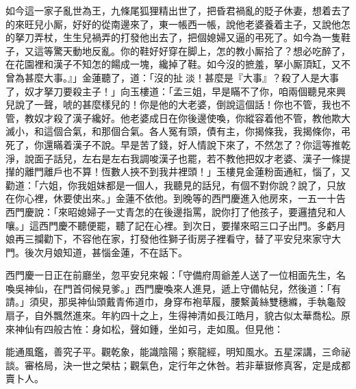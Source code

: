 如今這一家子亂世為王，九條尾狐狸精出世了，把昏君禍亂的貶子休妻，想着去了的來旺兒小厮，好好的從南邊來了，東一帳西一帳，說他老婆養着主子，又說他怎的拏刀弄杖，生生兒禍弄的打發他出去了，把個媳婦又逼的弔死了。如今為一隻鞋子，又這等驚天動地反亂。你的鞋好好穿在脚上，怎的教小厮拾了？想必吃醉了，在花園裡和漢子不知怎的餳成一塊，纔掉了鞋。如今沒的摭羞，拏小厮頂缸，{}又不曾為甚麼大事。』」金蓮聽了，道：「沒的扯𣭈淡！甚麼是『大事』？殺了人是大事了，奴才拏刀要殺主子！」向玉樓道：「孟三姐，早是瞞不了你，咱兩個聽見來興兒說了一聲，唬的甚麼樣兒的！你是他的大老婆，倒說這個話！你也不管，我也不管，教奴才殺了漢子纔好。他老婆成日在你後邊使喚，你縱容着他不管，教他欺大滅小，和這個合氣，和那個合氣。各人冤有頭，債有主，你揭條我，我揭條你，弔死了，你還瞞着漢子不說。早是苦了錢，好人情說下來了，不然怎了？{}你這等推乾淨，說面子話兒，左右是左右我調唆漢子也罷，若不教他把奴才老婆、漢子一條提攆的離門離戶也不算！恆數人挾不到我井裡頭！」玉樓見金蓮粉面通紅，惱了，又勸道：「六姐，你我姐妹都是一個人，我聽見的話兒，有個不對你說？說了，只放在你心裡，休要使出來。」{}金蓮不依他。到晚等的西門慶進入他房來，一五一十告西門慶說：「來昭媳婦子一丈青怎的在後邊指罵，說你打了他孩子，要邏揸兒和人嚷。」這西門慶不聽便罷，聽了記在心裡。到次日，要攆來昭三口子出門。多虧月娘再三攔勸下，不容他在家，打發他徃獅子街房子裡看守，替了平安兒來家守大門。後次月娘知道，甚惱金蓮，不在話下。

西門慶一日正在前廳坐，忽平安兒來報：「守備府周爺差人送了一位相面先生，名喚吳神仙，在門首伺候見爹。」西門慶喚來人進見，遞上守備帖兒，然後道：「有請。」須臾，那吳神仙頭戴青佈道巾，身穿布袍草履，腰繫黃絲雙穗縧，手執龜殼扇子，自外飄然進來。年約四十之上，生得神清如長江皓月，貌古似太華喬松。原來神仙有四般古恠：身如松，聲如鍾，坐如弓，走如風。但見他：

\begin{myquote}
能通風鑑，善究子平。觀乾象，能識陰陽；察龍經，明知風水。五星深講，三命祕談。審格局，決一世之榮枯；觀氣色，定行年之休咎。若非華嶽修真客，定是成都賣卜人。
\end{myquote}

